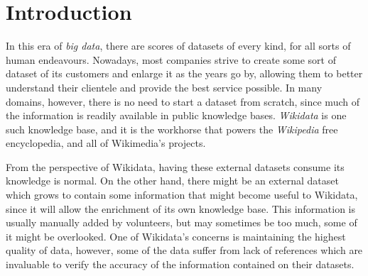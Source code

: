 \documentclass[epsfig,a4paper,11pt,titlepage,twoside,openany]{book}
\begin{document}
      



\chapter{Introduction}
\label{chap:introduction}

In this era of \textit{big data}, there are scores of datasets of every kind, for all sorts of human endeavours. Nowadays, most companies strive to create some sort of dataset of its customers and enlarge it as the years go by, allowing them to better understand their clientele and provide the best service possible. In many domains, however, there is no need to start a dataset from scratch, since much of the information is readily available in public knowledge bases. \textit{Wikidata} is one such knowledge base, and it is the workhorse that powers the \textit{Wikipedia} free encyclopedia, and all of Wikimedia's projects.

From the perspective of Wikidata, having these external datasets consume its knowledge is normal. On the other hand, there might be an external dataset which grows to contain some information that might become useful to Wikidata, since it will allow the enrichment of its own knowledge base. This information is usually manually added by volunteers, but may sometimes be too much, some of it might be overlooked. One of Wikidata's concerns is maintaining the highest quality of data, however, some of the data suffer from lack of references which are invaluable to verify the accuracy of the information contained on their datasets.
\end{document}
